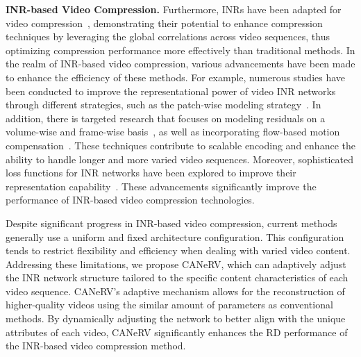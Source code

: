 \noindent \textbf{INR-based Video Compression.}
Furthermore, INRs have been adapted for video compression~\cite{DBLP:journals/corr/abs-2112-11312,DBLP:conf/iccv/Tang0ZM23,DBLP:conf/nips/KwanGZGB23,DBLP:conf/cvpr/ChenGLS23a,DBLP:conf/cvpr/0004Y0WCHRLS23,DBLP:conf/nips/ChenHWRLS21,DBLP:conf/eccv/LiWPXML22}, demonstrating their potential to enhance compression techniques by leveraging the global correlations across video sequences, thus optimizing compression performance more effectively than traditional methods.
In the realm of INR-based video compression, various advancements have been made to enhance the efficiency of these methods. For example, numerous studies have been conducted to improve the representational power of video INR networks through different strategies, such as the patch-wise modeling strategy~\cite{DBLP:conf/cvpr/MaiyaGE0LPWWS23,DBLP:conf/icip/BaiDWY23}. In addition, there is targeted research that focuses on modeling residuals on a volume-wise and frame-wise basis~\cite{DBLP:conf/cvpr/MaiyaGE0LPWWS23,DBLP:conf/cvpr/ZhaoAM23}, as well as incorporating flow-based motion compensation~\cite{DBLP:journals/corr/abs-2112-11312,DBLP:conf/mm/LeeRKP23}. These techniques contribute to scalable encoding and enhance the ability to handle longer and more varied video sequences. Moreover, sophisticated loss functions for INR networks have been explored to improve their representation capability~\cite{DBLP:conf/iccv/Tang0ZM23}. These advancements significantly improve the performance of INR-based video compression technologies.

Despite significant progress in INR-based video compression, current methods generally use a uniform and fixed architecture configuration. This configuration tends to restrict flexibility and efficiency when dealing with varied video content. Addressing these limitations, we propose CANeRV, which can adaptively adjust the INR network structure tailored to the specific content characteristics of each video sequence. CANeRV’s adaptive mechanism allows for the reconstruction of higher-quality videos using the similar amount of parameters as conventional methods. By dynamically adjusting the network to better align with the unique attributes of each video, CANeRV significantly enhances the RD performance of the INR-based video compression method.